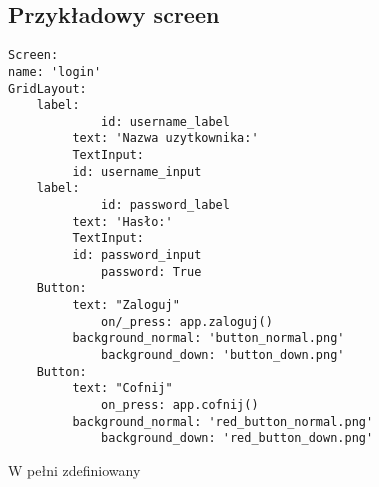 \documentclass{xmgr}
\begin{document}
\subsection{Przykładowy screen}
\begin{lstlisting} 
Screen:
name: 'login'
GridLayout:
	label:
             id: username_label
	     text: 'Nazwa uzytkownika:'
	     TextInput:
	     id: username_input
	label:
             id: password_label
	     text: 'Hasło:'
	     TextInput:
	     id: password_input
             password: True
	Button:
	     text: "Zaloguj"
             on/_press: app.zaloguj()
	     background_normal: 'button_normal.png'
             background_down: 'button_down.png'		
	Button:
	     text: "Cofnij"
             on_press: app.cofnij()
	     background_normal: 'red_button_normal.png'
             background_down: 'red_button_down.png'
\end{lstlisting}
W pełni zdefiniowany

\end{document}
